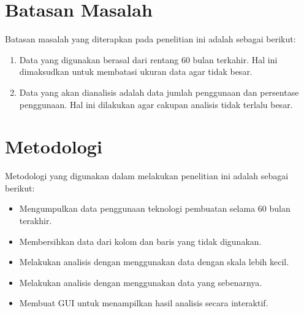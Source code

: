 \section{Batasan Masalah}
\label{sec:batasan}
Batasan masalah yang diterapkan pada penelitian ini adalah sebagai berikut:
\begin{enumerate}
    \item Data yang digunakan berasal dari rentang 60 bulan terkahir. Hal ini dimaksudkan untuk membatasi ukuran data agar tidak besar.
    \item Data yang akan dianalisis adalah data jumlah penggunaan dan persentase penggunaan. Hal ini dilakukan agar cakupan analisis tidak terlalu besar.
\end{enumerate}

\section{Metodologi}
\label{sec:metlit}
Metodologi yang digunakan dalam melakukan penelitian ini adalah sebagai berikut:
\begin{itemize}
    \item Mengumpulkan data penggunaan teknologi pembuatan \web selama 60 bulan terakhir.
    \item Membersihkan data dari kolom dan baris yang tidak digunakan.
    \item Melakukan analisis dengan menggunakan data dengan skala lebih kecil.
    \item Melakukan analisis dengan menggunakan data yang sebenarnya.
    \item Membuat GUI untuk menampilkan hasil analisis secara interaktif.
\end{itemize}

